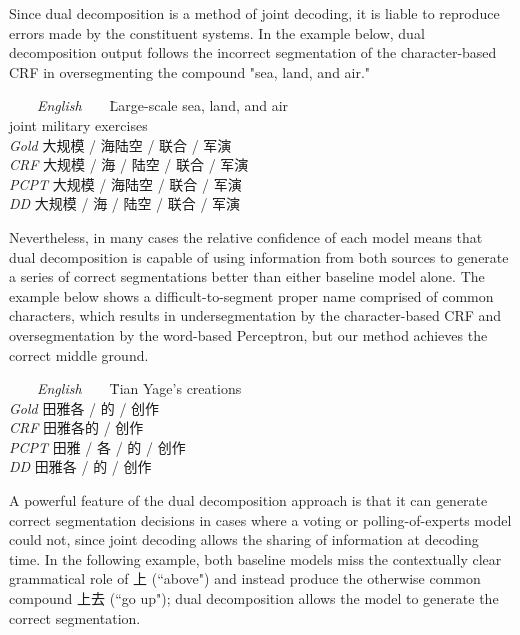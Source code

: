 Since dual decomposition is a method of joint decoding, it is liable to reproduce errors made by the constituent systems. In the example below, dual decomposition output follows the incorrect segmentation of the character-based CRF in oversegmenting the compound "sea, land, and air." 

\begin{tabbing}

\ \ \ \ \= \emph{English}\ \ \ \ \= Large-scale sea, land, and air \\ 
\> \> joint military exercises\\
\> \emph{Gold}\> 大规模 / 海陆空 / 联合 / 军演\\

\> \emph{CRF}\> 大规模 / 海 / 陆空 / 联合 / 军演\\

\> \emph{PCPT}\> 大规模 / 海陆空 / 联合 / 军演\\

\> \emph{DD}\> 大规模 / 海 / 陆空 / 联合 / 军演\\
\end{tabbing}

Nevertheless, in many cases the relative confidence of each model means that dual decomposition is capable of using information from both sources to generate a series of correct segmentations better than either baseline model alone. The example below shows a difficult-to-segment proper name comprised of common characters, which results in undersegmentation by the character-based CRF and oversegmentation by the word-based Perceptron, but our method achieves the correct middle ground.

\begin{tabbing}
\ \ \ \ \= \emph{English}\ \ \ \ \= Tian Yage's creations \\
\> \emph{Gold} \>   田雅各 / 的 / 创作 \\
\> \emph{CRF} \>  田雅各的 / 创作 \\
\> \emph{PCPT} \>  田雅 / 各 / 的 / 创作 \\
\> \emph{DD} \>  田雅各 / 的 / 创作 \\
\end{tabbing}

A powerful feature of the dual decomposition approach is that it can generate correct segmentation decisions in cases where a voting or polling-of-experts model could not, since joint decoding allows the sharing of information at decoding time. In the following example, both baseline models miss the contextually clear grammatical role of 上 (``above") and instead produce the otherwise common compound 上去 (``go up"); dual decomposition allows the model to generate the correct segmentation.

